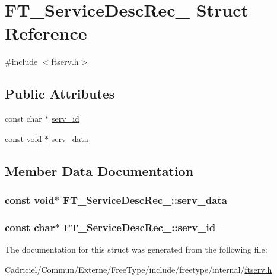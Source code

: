 \hypertarget{struct_f_t___service_desc_rec__}{\section{F\-T\-\_\-\-Service\-Desc\-Rec\-\_\- Struct Reference}
\label{struct_f_t___service_desc_rec__}
}


{\ttfamily \#include $<$ftserv.\-h$>$}

\subsection*{Public Attributes}
\begin{DoxyCompactItemize}
\item 
const char $\ast$ \hyperlink{struct_f_t___service_desc_rec___ab706270db01e1398233571f10bd249d4}{serv\-\_\-id}
\item 
const \hyperlink{wglew_8h_aeea6e3dfae3acf232096f57d2d57f084}{void} $\ast$ \hyperlink{struct_f_t___service_desc_rec___aa597a33a2b0d099ec32882dc6aa38d59}{serv\-\_\-data}
\end{DoxyCompactItemize}


\subsection{Member Data Documentation}
\hypertarget{struct_f_t___service_desc_rec___aa597a33a2b0d099ec32882dc6aa38d59}{
\subsubsection[{serv\-\_\-data}]{\setlength{\rightskip}{0pt plus 5cm}const {\bf void}$\ast$ F\-T\-\_\-\-Service\-Desc\-Rec\-\_\-\-::serv\-\_\-data}}\label{struct_f_t___service_desc_rec___aa597a33a2b0d099ec32882dc6aa38d59}
\hypertarget{struct_f_t___service_desc_rec___ab706270db01e1398233571f10bd249d4}{
\subsubsection[{serv\-\_\-id}]{\setlength{\rightskip}{0pt plus 5cm}const char$\ast$ F\-T\-\_\-\-Service\-Desc\-Rec\-\_\-\-::serv\-\_\-id}}\label{struct_f_t___service_desc_rec___ab706270db01e1398233571f10bd249d4}


The documentation for this struct was generated from the following file\-:\begin{DoxyCompactItemize}
\item 
Cadriciel/\-Commun/\-Externe/\-Free\-Type/include/freetype/internal/\hyperlink{ftserv_8h}{ftserv.\-h}\end{DoxyCompactItemize}
